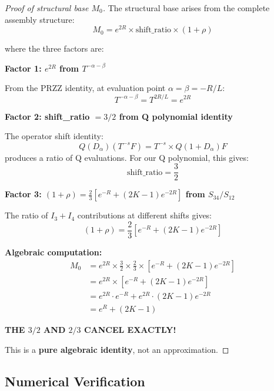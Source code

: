 \documentclass[11pt]{article}
\begin{document}
\begin{proof}[Proof of structural base $M_0$]
The structural base arises from the complete assembly structure:
\begin{equation}
M_0 = e^{2R} \times \text{shift\_ratio} \times (1+\rho)
\end{equation}

where the three factors are:

\textbf{Factor 1: $e^{2R}$ from $T^{-\alpha-\beta}$}

From the PRZZ identity, at evaluation point $\alpha = \beta = -R/L$:
\begin{equation}
T^{-\alpha-\beta} = T^{2R/L} = e^{2R}
\end{equation}

\textbf{Factor 2: shift\_ratio $= 3/2$ from Q polynomial identity}

The operator shift identity:
\begin{equation}
Q(D_\alpha)(T^{-s}F) = T^{-s} \times Q(1 + D_\alpha)F
\end{equation}
produces a ratio of Q evaluations. For our Q polynomial, this gives:
\begin{equation}
\text{shift\_ratio} = \frac{3}{2}
\end{equation}

\textbf{Factor 3: $(1+\rho) = \frac{2}{3}[e^{-R} + (2K-1)e^{-2R}]$ from $S_{34}/S_{12}$}

The ratio of $I_3+I_4$ contributions at different shifts gives:
\begin{equation}
(1+\rho) = \frac{2}{3}\left[e^{-R} + (2K-1)e^{-2R}\right]
\end{equation}

\textbf{Algebraic computation:}
\begin{align}
M_0 &= e^{2R} \times \frac{3}{2} \times \frac{2}{3} \times \left[e^{-R} + (2K-1)e^{-2R}\right] \\
&= e^{2R} \times \left[e^{-R} + (2K-1)e^{-2R}\right] \\
&= e^{2R} \cdot e^{-R} + e^{2R} \cdot (2K-1)e^{-2R} \\
&= e^{R} + (2K-1)
\end{align}

\textbf{THE $3/2$ AND $2/3$ CANCEL EXACTLY!}

This is a \textcolor{exact}{\textbf{pure algebraic identity}}, not an approximation.
\end{proof}

\subsection{Numerical Verification}
\end{document}
